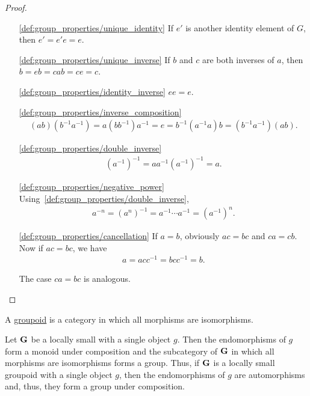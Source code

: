 \begin{proof}\mbox{}
  \begin{itemize}
    \item[\ref{def:group_properties/unique_identity}] If $e'$ is another identity element of $G$, then $e' = e' e = e$.
    \item[\ref{def:group_properties/unique_inverse}] If $b$ and $c$ are both inverses of $a$, then $b = eb = cab = ce = c$.
    \item[\ref{def:group_properties/identity_inverse}] $ee = e$.
    \item[\ref{def:group_properties/inverse_composition}]
    \begin{align*}
      (ab) (b^{-1} a^{-1})
      =
      a (b b^{-1}) a^{-1}
      =
      e
      =
      b^{-1} (a^{-1} a) b
      =
      (b^{-1} a^{-1}) (ab).
    \end{align*}

    \item[\ref{def:group_properties/double_inverse}]
    \begin{align*}
      (a^{-1})^{-1}
      =
      a a^{-1} (a^{-1})^{-1}
      =
      a.
    \end{align*}

    \item[\ref{def:group_properties/negative_power}] Using~\ref{def:group_properties/double_inverse},
    \begin{align*}
      a^{-n}
      =
      (a^n)^{-1}
      =
      a^{-1} \cdots a^{-1}
      =
      (a^{-1})^n.
    \end{align*}

    \item[\ref{def:group_properties/cancellation}] If $a = b$, obviously $ac = bc$ and $ca = cb$. Now if $ac = bc$, we have
    \begin{align*}
      a = acc^{-1} = bcc^{-1} = b.
    \end{align*}

    The case $ca = bc$ is analogous.
  \end{itemize}
\end{proof}

\begin{definition}\label{def:groupoid}
  A \ul{groupoid} is a category in which all morphisms are isomorphisms.
\end{definition}

\begin{definition}\label{note:groupoids}
  Let $\operatorname{\mathbf{G}}$ be a locally small with a single object $g$. Then the endomorphisms of $g$ form a monoid under composition and the subcategory of $\operatorname{\mathbf{G}}$ in which all morphisms are isomorphisms forms a group. Thus, if $\operatorname{\mathbf{G}}$ is a locally small groupoid with a single object $g$, then the endomorphisms of $g$ are automorphisms and, thus, they form a group under composition.
\end{definition}

